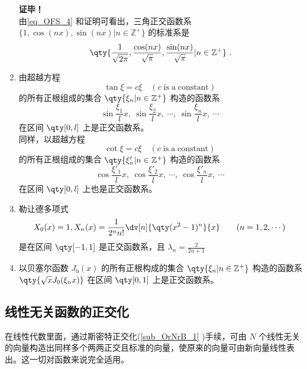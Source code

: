 \begin{enumerate}
\textbf{证毕！}\\
由\autoref{eq_OFS_4} 和证明可看出，三角正交函数系 $\{1,\cos(nx),\sin(nx)|n\in \mathbb Z^{+}\}$ 的标准系是 
\begin{equation}
\qty{\frac{1}{\sqrt{2\pi}},\frac{\cos(nx)}{\sqrt{\pi}},\frac{\sin(nx)}{\sqrt{\pi}}{\huge|}n\in \mathbb Z^{+}}~.
\end{equation}




\item 由超越方程
\begin{equation}
\tan\xi=c\xi \quad(c\; \mathrm{is\; a\; constant})~
\end{equation}
 的所有正根组成的集合 $\qty{\xi_n\vert n\in\mathbb{Z}^+}$
 构造的函数系
 \begin{equation}
 \sin\frac{\xi_1}{l}x,\ \sin\frac{\xi_2}{l}x,\ \cdots,\ \sin\frac{\xi_n}{l}x,\ \cdots~
 \end{equation}
 在区间 $\qty[0,l]$ 上是正交函数系。\\
 
 同样，以超越方程
\begin{equation}
\cot\xi=c\xi \quad(c\; \mathrm{is\; a\; constant})~
\end{equation}
 的所有正根组成的集合 $\qty{\xi'_n\vert n\in\mathbb{Z}^+}$
 构造的函数系
 \begin{equation}
 \cos\frac{\xi'_1}{l}x,\ \cos\frac{\xi'_2}{l}x,\ \cdots,\ \cos\frac{\xi'_n}{l}x,\ \cdots~
 \end{equation}
 在区间 $\qty[0,l]$ 上也是正交函数系。
 \item 勒让德多项式
\begin{equation}
X_0(x)=1,X_n(x)=\frac{1}{2^nn!}\dv[n]{\qty(x^2-1)^n}{x}\qquad(n=1,2,\cdots)~
\end{equation}
是在区间 $\qty[-1,1]$ 是正交函数系，且 $\lambda_n=\frac{2}{2n+1}$
\item 以贝塞尔函数 $J_0(x)$ 的所有正根构成的集合 $\qty{\xi_n\vert n\in\mathbb{Z}^+}$
构造的函数系 $\qty{\sqrt{x}J_0(\xi_n x)} $ 在区间 $\qty[0,1]$ 上是正交函数系。
\end{enumerate}

\subsection{线性无关函数的正交化}
在线性代数里面，通过斯密特正交化(\autoref{sub_OrNrB_1} )手续，可由 $N$ 个线性无关的向量构造出同样多个两两正交且标准的向量，使原来的向量可由新向量线性表出。这一切对函数来说完全适用。

